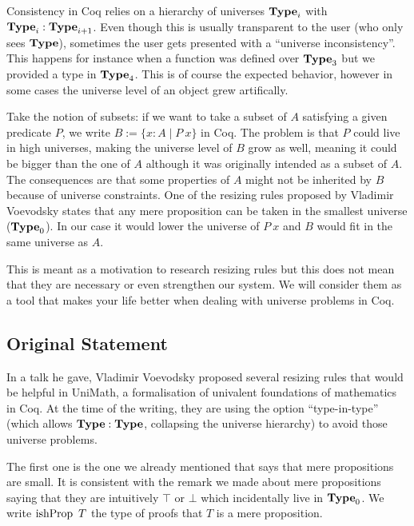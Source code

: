 \documentclass[11pt]{article}
\theoremstyle{plain}
\theoremstyle{remark}
\begin{document}
Consistency in Coq relies on a hierarchy of universes $\operatorname{\mathbf{Type}}_i$ with
$\operatorname{\mathbf{Type}}_i : \operatorname{\mathbf{Type}}_{i+1}$. Even though this is usually transparent to the user
(who only sees $\operatorname{\mathbf{Type}}$), sometimes the user gets presented with a
``universe inconsistency''. This happens for instance when a function was
defined over $\operatorname{\mathbf{Type}}_3$ but we provided a type in $\operatorname{\mathbf{Type}}_4$.
This is of course the expected behavior, however in some cases the universe
level of an object grew artifically.

Take the notion of subsets: if we want to take a subset of $A$ satisfying
a given predicate $P$, we write $B := \{ x : A \mid P\ x \}$ in Coq.
The problem is that $P$ could live in high universes, making the universe level
of $B$ grow as well, meaning it could be bigger than the one of $A$ although
it was originally intended as a subset of $A$.
The consequences are that some properties of $A$ might not be inherited by
$B$ because of universe constraints.
One of the resizing rules proposed by Vladimir Voevodsky states that any
mere proposition can be taken in the smallest universe ($\operatorname{\mathbf{Type}}_0$).
In our case it would lower the universe of $P\ x$ and $B$ would fit in the same
universe as $A$.

This is meant as a motivation to research resizing rules but this does not mean
that they are necessary or even strengthen our system.
We will consider them as a tool that makes your life better when dealing with
universe problems in Coq.

\subsection{Original Statement}

In a talk he gave, Vladimir Voevodsky proposed several resizing rules that would
be helpful in UniMath, a formalisation of univalent foundations of mathematics
in Coq. At the time of the writing, they are using the option ``type-in-type''
(which allows $\operatorname{\mathbf{Type}} : \operatorname{\mathbf{Type}}$, collapsing the universe hierarchy) to avoid
those universe problems.

The first one is the one we already mentioned that says that mere propositions
are small. It is consistent with the remark we made about mere propositions
saying that they are intuitively $\top$ or $\bot$ which incidentally live in
$\operatorname{\mathbf{Type}}_0$. We write $\operatorname{ishProp}\ T$ the type of proofs that $T$ is a mere
proposition.

\begin{mathc}
\end{mathc}
\end{document}
